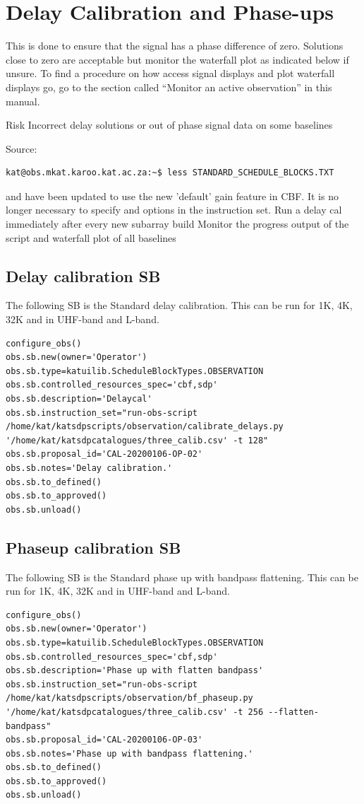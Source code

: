 \section{ Delay Calibration and Phase-ups}
This is done to ensure that the signal has a phase difference of zero. Solutions close to zero are acceptable but monitor the waterfall plot as indicated below if unsure. To find a procedure on how access signal displays and plot waterfall displays go, go to the section called “Monitor an active observation” in this manual.

Risk
Incorrect delay solutions or out of phase signal data on some baselines

Source:
\begin{lstlisting}[style=DOS]
kat@obs.mkat.karoo.kat.ac.za:~$ less STANDARD_SCHEDULE_BLOCKS.TXT
\end{lstlisting}

 

 and  have been updated to use the new 'default' gain feature in CBF. It is no longer necessary to specify  and  options in the instruction set. 
Run a delay cal immediately after every new subarray build
Monitor the progress output of the script and waterfall plot of all baselines

\subsection{Delay calibration SB}
The following SB is the Standard delay calibration. This can be run for 1K, 4K, 32K and in UHF-band and L-band.
\begin{lstlisting}[style=DOS]
configure_obs()
obs.sb.new(owner='Operator')
obs.sb.type=katuilib.ScheduleBlockTypes.OBSERVATION
obs.sb.controlled_resources_spec='cbf,sdp'
obs.sb.description='Delaycal'
obs.sb.instruction_set="run-obs-script /home/kat/katsdpscripts/observation/calibrate_delays.py '/home/kat/katsdpcatalogues/three_calib.csv' -t 128"
obs.sb.proposal_id='CAL-20200106-OP-02'
obs.sb.notes='Delay calibration.'
obs.sb.to_defined()
obs.sb.to_approved()
obs.sb.unload()
\end{lstlisting}


\subsection {Phaseup calibration SB}
The following SB is the Standard phase up with bandpass flattening. This can be run for 1K, 4K, 32K and in UHF-band and L-band.
\begin{lstlisting}[style=DOS]
configure_obs()
obs.sb.new(owner='Operator')
obs.sb.type=katuilib.ScheduleBlockTypes.OBSERVATION
obs.sb.controlled_resources_spec='cbf,sdp'
obs.sb.description='Phase up with flatten bandpass'
obs.sb.instruction_set="run-obs-script /home/kat/katsdpscripts/observation/bf_phaseup.py '/home/kat/katsdpcatalogues/three_calib.csv' -t 256 --flatten-bandpass"
obs.sb.proposal_id='CAL-20200106-OP-03'
obs.sb.notes='Phase up with bandpass flattening.'
obs.sb.to_defined()
obs.sb.to_approved()
obs.sb.unload()
\end{lstlisting}

